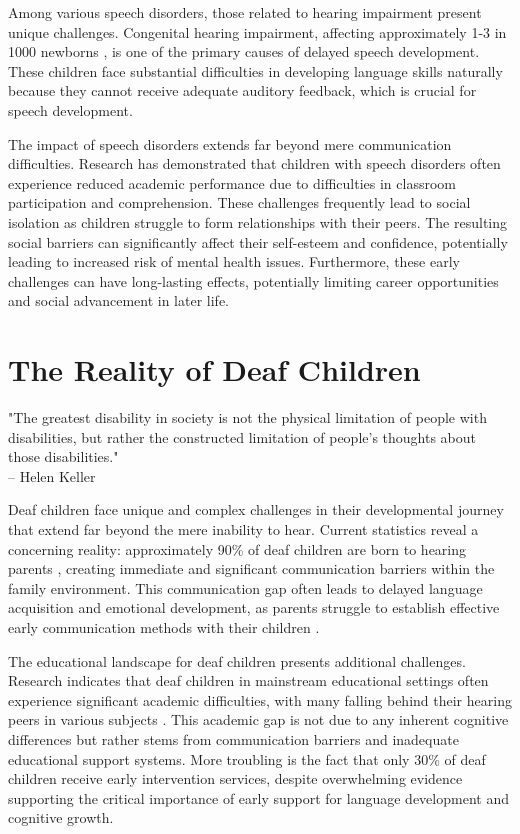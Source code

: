 Among various speech disorders, those related to hearing impairment present unique challenges. Congenital hearing impairment, affecting approximately 1-3 in 1000 newborns \cite{hearing2022}, is one of the primary causes of delayed speech development. These children face substantial difficulties in developing language skills naturally because they cannot receive adequate auditory feedback, which is crucial for speech development.

The impact of speech disorders extends far beyond mere communication difficulties. Research has demonstrated that children with speech disorders often experience reduced academic performance due to difficulties in classroom participation and comprehension. These challenges frequently lead to social isolation as children struggle to form relationships with their peers. The resulting social barriers can significantly affect their self-esteem and confidence, potentially leading to increased risk of mental health issues. Furthermore, these early challenges can have long-lasting effects, potentially limiting career opportunities and social advancement in later life.



\section{The Reality of Deaf Children}
\label{sec:deaf_children}

\begin{displayquote}
    "The greatest disability in society is not the physical limitation of people with disabilities, but rather the constructed limitation of people's thoughts about those disabilities."
    \\ -- Helen Keller
\end{displayquote}


Deaf children face unique and complex challenges in their developmental journey that extend far beyond the mere inability to hear. Current statistics reveal a concerning reality: approximately 90\% of deaf children are born to hearing parents \cite{deaf2023}, creating immediate and significant communication barriers within the family environment. This communication gap often leads to delayed language acquisition and emotional development, as parents struggle to establish effective early communication methods with their children \cite{family_support2022}.

The educational landscape for deaf children presents additional challenges. Research indicates that deaf children in mainstream educational settings often experience significant academic difficulties, with many falling behind their hearing peers in various subjects \cite{deaf_education2023}. This academic gap is not due to any inherent cognitive differences but rather stems from communication barriers and inadequate educational support systems. More troubling is the fact that only 30\% of deaf children receive early intervention services, despite overwhelming evidence supporting the critical importance of early support for language development and cognitive growth.

